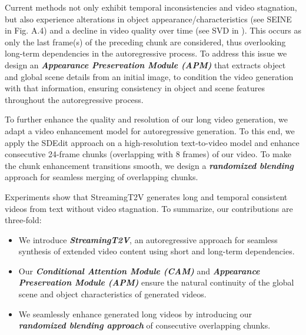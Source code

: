 Current methods not only exhibit temporal inconsistencies and video stagnation, but also experience alterations in object appearance/characteristics (see \eg SEINE \cite{chen2023seine} in 
Fig. \textcolor{linkblue}{A.4})
and a decline in video quality over time (see \eg SVD \cite{SVD} in ).
This occurs as  only the last frame(s) of the preceding chunk are considered, thus overlooking long-term dependencies in the autoregressive process. 
%
To address this issue we design an \textbf{\textit{Appearance Preservation Module (APM)}} that extracts object and global scene details from an initial image, to condition the video generation with that information, ensuring consistency in object and scene features  throughout the autoregressive process.   

To further enhance the quality and resolution of our long video generation, we adapt a video enhancement model for autoregressive generation.
To this end, we apply the SDEdit \cite{meng2021sdedit} approach on a high-resolution text-to-video model and  enhance consecutive 24-frame chunks (overlapping with 8 frames) of our video.
To make the chunk enhancement transitions smooth, we design a \textbf{\textit{randomized blending}} approach for seamless merging of overlapping chunks.

Experiments show that StreamingT2V generates long and temporal consistent videos from text without video stagnation. 
To summarize, our contributions are three-fold:
\begin{itemize}
    \item We introduce \textbf{\textit{StreamingT2V}}, an autoregressive approach for seamless synthesis of extended video content 
    using short and long-term dependencies. 
    \item Our \textbf{\textit{Conditional Attention Module (CAM)}} and \textbf{\textit{Appearance Preservation Module (APM)}} ensure the natural continuity of the global scene and object characteristics of generated videos.
    \item We seamlessly enhance generated long videos by introducing our \textbf{\textit{randomized blending approach}} of consecutive overlapping chunks.
\end{itemize}